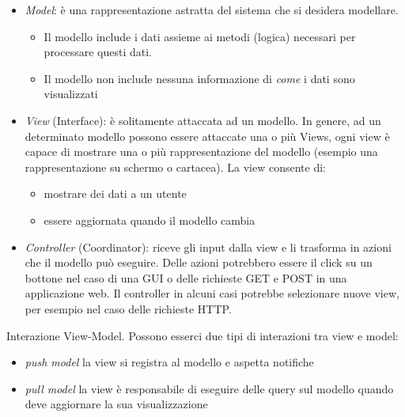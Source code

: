 \documentclass{article}
\begin{document}
\begin{itemize}
\item \emph{Model}: \`e una rappresentazione astratta del sistema che si desidera modellare. 
\begin{itemize}
\item Il modello include i dati assieme ai metodi (logica) necessari per processare questi dati. 
\item Il modello non include nessuna informazione di \emph{come} i dati sono visualizzati
\end{itemize}
\item \emph{View} (Interface): \`e solitamente attaccata ad un modello. In genere, ad un determinato modello possono essere attaccate una o pi\`u Views, ogni view \`e capace di mostrare una o pi\`u rappresentazione del modello (esempio una rappresentazione su schermo o cartacea). La view consente di:
\begin{itemize}
\item mostrare dei dati a un utente
\item essere aggiornata quando il modello cambia
\end{itemize}
\item \emph{Controller} (Coordinator): riceve gli input dalla view e li trasforma in azioni che il modello pu\`o eseguire. Delle azioni potrebbero essere il click su un bottone nel caso di una GUI o delle richieste GET e POST in una applicazione web. Il controller in alcuni casi potrebbe selezionare nuove view, per esempio nel caso delle richieste HTTP.
\end{itemize}



Interazione View-Model. Possono esserci due tipi di interazioni tra view e model:
\begin{itemize}
\item \emph{push model} la view si registra al modello e aspetta notifiche
\item \emph{pull model} la view \`e responsabile di eseguire delle query sul modello quando deve aggiornare la sua visualizzazione
\end{itemize}
\end{document}

